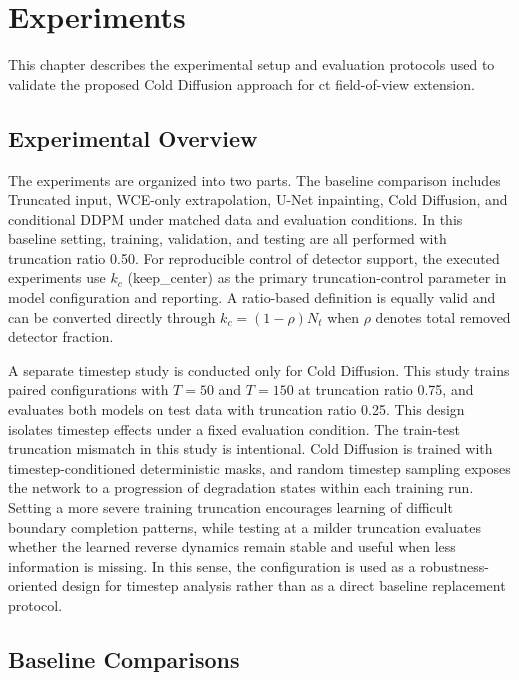 \chapter{Experiments}
\label{ch:experiments}

This chapter describes the experimental setup and evaluation protocols used to validate the proposed Cold Diffusion approach for \gls{ct} field-of-view extension.

\section{Experimental Overview}

The experiments are organized into two parts. The baseline comparison includes Truncated input, WCE-only extrapolation, U-Net inpainting, Cold Diffusion, and conditional DDPM under matched data and evaluation conditions. In this baseline setting, training, validation, and testing are all performed with truncation ratio 0.50.
For reproducible control of detector support, the executed experiments use \(k_c\) (keep\_center) as the primary truncation-control parameter in model configuration and reporting. A ratio-based definition is equally valid and can be converted directly through \(k_c=(1-\rho)N_t\) when \(\rho\) denotes total removed detector fraction.

A separate timestep study is conducted only for Cold Diffusion. This study trains paired configurations with \(T=50\) and \(T=150\) at truncation ratio 0.75, and evaluates both models on test data with truncation ratio 0.25. This design isolates timestep effects under a fixed evaluation condition.
The train-test truncation mismatch in this study is intentional. Cold Diffusion is trained with timestep-conditioned deterministic masks, and random timestep sampling exposes the network to a progression of degradation states within each training run. Setting a more severe training truncation encourages learning of difficult boundary completion patterns, while testing at a milder truncation evaluates whether the learned reverse dynamics remain stable and useful when less information is missing. In this sense, the configuration is used as a robustness-oriented design for timestep analysis rather than as a direct baseline replacement protocol.

\section{Baseline Comparisons}

